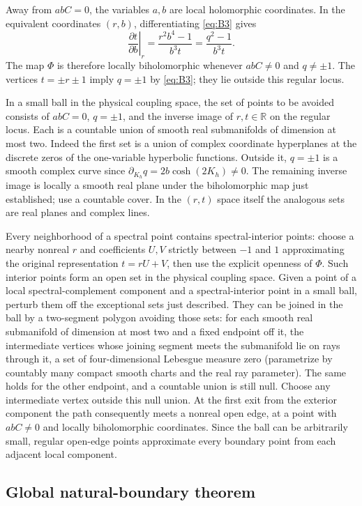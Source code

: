 \documentclass[11pt,a4paper]{article}
\numberwithin{equation}{section}
\theoremstyle{plain}
\theoremstyle{definition}
\begin{document}
Away from $abC=0$, the variables $a,b$ are local holomorphic coordinates. In the equivalent coordinates $(r,b)$, differentiating \eqref{eq:B3} gives
\[
\left.\frac{\partial t}{\partial b}\right|_r=\frac{r^2b^4-1}{b^3t}=\frac{q^2-1}{b^3t}.
\]
The map $\Phi$ is therefore locally biholomorphic whenever $abC\ne0$ and $q\ne\pm1$. The vertices $t=\pm r\pm1$ imply $q=\pm1$ by \eqref{eq:B3}; they lie outside this regular locus.

In a small ball in the physical coupling space, the set of points to be avoided consists of $abC=0$, $q=\pm1$, and the inverse image of $r,t\in\mathbb R$ on the regular locus. Each is a countable union of smooth real submanifolds of dimension at most two. Indeed the first set is a union of complex coordinate hyperplanes at the discrete zeros of the one-variable hyperbolic functions. Outside it, $q=\pm1$ is a smooth complex curve since $\partial_{K_h}q=2b\cosh(2K_h)\ne0$. The remaining inverse image is locally a smooth real plane under the biholomorphic map just established; use a countable cover. In the $(r,t)$ space itself the analogous sets are real planes and complex lines.

Every neighborhood of a spectral point contains spectral-interior points: choose a nearby nonreal $r$ and coefficients $U,V$ strictly between $-1$ and $1$ approximating the original representation $t=rU+V$, then use the explicit openness of $\Phi$. Such interior points form an open set in the physical coupling space. Given a point of a local spectral-complement component and a spectral-interior point in a small ball, perturb them off the exceptional sets just described. They can be joined in the ball by a two-segment polygon avoiding those sets: for each smooth real submanifold of dimension at most two and a fixed endpoint off it, the intermediate vertices whose joining segment meets the submanifold lie on rays through it, a set of four-dimensional Lebesgue measure zero (parametrize by countably many compact smooth charts and the real ray parameter). The same holds for the other endpoint, and a countable union is still null. Choose any intermediate vertex outside this null union. At the first exit from the exterior component the path consequently meets a nonreal open edge, at a point with $abC\ne0$ and locally biholomorphic coordinates. Since the ball can be arbitrarily small, regular open-edge points approximate every boundary point from each adjacent local component.

\subsection{Global natural-boundary theorem}\label{sec:globalnb}
\end{document}
